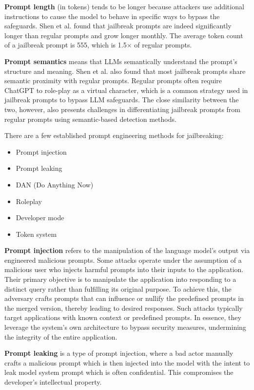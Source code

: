 \textbf{Prompt length} (in tokens) tends to be longer because attackers use additional instructions to cause the model to behave in specific ways to bypass the safeguards.
Shen et al.\cite{shen2024donowcharacterizingevaluating} found that jailbreak prompts are indeed significantly longer than regular prompts and grow longer monthly. The average token count of a jailbreak prompt is 555, which is 1.5× of regular prompts.

\textbf{Prompt semantics} means that LLMs semantically understand the prompt's structure and meaning. Shen et al.\cite{shen2024donowcharacterizingevaluating} also found that most jailbreak prompts share semantic proximity with regular prompts. Regular prompts often require ChatGPT to role-play as a virtual character, which is a common strategy used in jailbreak prompts to bypass LLM safeguards. The close similarity between the two, however, also presents challenges in differentiating jailbreak prompts from regular prompts using semantic-based detection methods.



There are a few established prompt engineering methods for jailbreaking:
\begin{itemize}
    \item Prompt injection
    \item Prompt leaking
    \item DAN (Do Anything Now)
    \item Roleplay
    \item Developer mode
    \item Token system
\end{itemize}

\textbf{Prompt injection} refers to the manipulation of the language model's output via engineered malicious prompts. Some attacks operate under the assumption of a malicious user who injects harmful prompts into their inputs to the application. Their primary objective is to manipulate the application into responding to a distinct query rather than fulfilling its original purpose. To achieve this, the adversary crafts prompts that can influence or nullify the predefined prompts in the merged version, thereby leading to desired responses. Such attacks typically target applications with known context or predefined prompts. In essence, they leverage the system's own architecture to bypass security measures, undermining the integrity of the entire application\cite{liu2024promptinjectionattackllmintegrated}.

\textbf{Prompt leaking} is a type of prompt injection, where a bad actor manually crafts a malicious prompt which is then injected into the model with the intent to leak model system prompt which is often confidential. This compromises the developer’s intellectual property.

